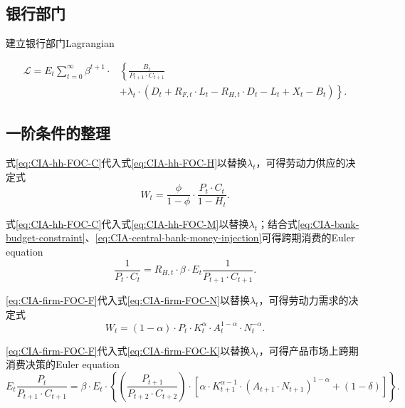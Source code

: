 \subsection{银行部门}
建立银行部门Lagrangian

\begin{align*}
  \mathcal{L} = E_t \sum_{t=0}^{\infty} \beta^{t+1} \cdot & \left\{ \frac{B_t}{P_{t+1} \cdot C_{t+1}} \right. \\
  &\left.
  + \lambda_t \cdot \left(D_t + R_{F,t} \cdot L_t - R_{H,t} \cdot D_t - L_t + X_t - B_t \right)
  \right\}.
\end{align*}

\subsection{一阶条件的整理}
式\eqref{eq:CIA-hh-FOC-C}代入式\eqref{eq:CIA-hh-FOC-H}以替换$\lambda_t$，可得劳动力供应的决定式
\begin{equation}
  \label{eq:CIA-FOC-labor-supply}
  W_t = \frac{\phi}{1-\phi} \cdot \frac{P_t \cdot C_t}{1-H_t}.
\end{equation}

式\eqref{eq:CIA-hh-FOC-C}代入式\eqref{eq:CIA-hh-FOC-M}以替换$\lambda_t$；结合式\eqref{eq:CIA-bank-budget-constraint}、\eqref{eq:CIA-central-bank-money-injection}可得跨期消费的Euler equation
\begin{equation}
  \label{eq:CIA-FOC-intertemp-consumption-euler}
  \frac{1}{P_t \cdot C_t} = R_{H,t} \cdot \beta \cdot E_t \frac{1}{P_{t+1} \cdot C_{t+1}}.
\end{equation}

\eqref{eq:CIA-firm-FOC-F}代入式\eqref{eq:CIA-firm-FOC-N}以替换$\lambda_t$，可得劳动力需求的决定式
\begin{equation}
  \label{eq:CIA-FOC-labor-demand}
  W_t = \left( 1-\alpha \right) \cdot P_t \cdot K_t^{\alpha} \cdot A_{t}^{1- \alpha} \cdot N_t^{-\alpha}.
\end{equation}

 \eqref{eq:CIA-firm-FOC-F}代入式\eqref{eq:CIA-firm-FOC-K}以替换$\lambda_t$，可得产品市场上跨期消费决策的Euler equation
\begin{equation}
  \label{eq:CIA-FOC-goods}
  E_t \frac{P_t}{P_{t+1} \cdot C_{t+1}} = \beta \cdot E_t \cdot
  \left\{
\left( \frac{P_{t+1}}{P_{t+2} \cdot C_{t+2}} \right) \cdot
\left[
  \alpha \cdot K_{t+1}^{\alpha -1 } \cdot
  \left(A_{t+1} \cdot N_{t+1} \right)^{1-\alpha} + (1-\delta)
\right]
  \right\}.
\end{equation}


